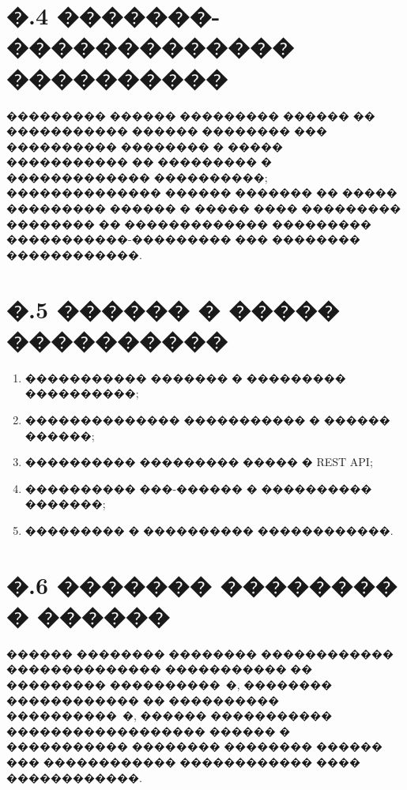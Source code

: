 \section*{�.4 �������-������������� ����������}

��������� ������ ��������� ������ �� ����������� ������ �������� ��� ���������� �������� � ����� ����������� �� ��������� � ������������� ����������; �������������� ������ ������� �� ����� ��������� ������ � ����� ���� ��������� �������� �� ������������� ��������� �����������-��������� ��� �������� ������������.

\section*{�.5 ������ � ����� ����������}

\begin{enumerate}
  \item ����������� ������� � ��������� ����������;
  \item �������������� ����������� � ������ ������;
  \item ���������� ��������� ����� � REST API;
  \item ���������� ���-������ � ���������� �������;
  \item ��������� � ���������� ������������.
\end{enumerate}

\section*{�.6 ������� �������� � ������}

������ �������� �������� ������������ �������������� ����������� �� ��������� ����������~�, �������� ������������ �� ���������� ����������~�, ������ ����������� ������������������ ������ � ����������� �������� �������� ������ ��� ������������ ������������ ���� ������������.
